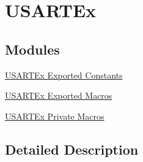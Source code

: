 \hypertarget{group___u_s_a_r_t_ex}{}\section{U\+S\+A\+R\+T\+Ex}
\label{group___u_s_a_r_t_ex}
\subsection*{Modules}
\begin{DoxyCompactItemize}
\item 
\hyperlink{group___u_s_a_r_t_ex___exported___constants}{U\+S\+A\+R\+T\+Ex Exported Constants}
\item 
\hyperlink{group___u_s_a_r_t_ex___exported___macros}{U\+S\+A\+R\+T\+Ex Exported Macros}
\item 
\hyperlink{group___u_s_a_r_t_ex___private___macros}{U\+S\+A\+R\+T\+Ex Private Macros}
\end{DoxyCompactItemize}


\subsection{Detailed Description}
